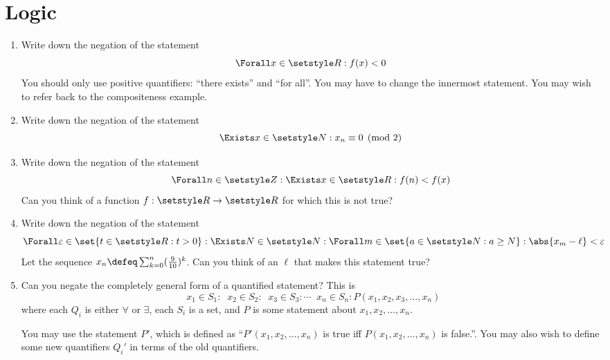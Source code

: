 \section{Logic}

\begin{enumerate}
 \item
  Write down the negation of the statement
  \begin{equation*}
   \Forall x \in \Reals: f(x) < 0
  \end{equation*}
  You should only use positive quantifiers: ``there exists'' and ``for all''.
  You may have to change the innermost statement. You may wish to refer back to
  the compositeness example.
 \item
  Write down the negation of the statement
  \begin{equation*}
   \Exists x \in \Naturals : x_n \equiv 0 \pmod 2
  \end{equation*}
 \item
  Write down the negation of the statement
  \begin{equation*}
   \Forall n \in \Integers :
   \Exists x \in \Reals :
   f(n) < f(x)
  \end{equation*}
  Can you think of a function \(f : \Reals \to \Reals\) for which this is not
  true?
 \item
  Write down the negation of the statement
  \begin{equation*}
   \Forall \epsilon \in \set{t \in \Reals: t > 0} :
   \Exists N \in \Naturals :
   \Forall m \in \set{a \in \Naturals : a \ge N}:
   \abs{x_m - \ell} < \epsilon
  \end{equation*}
  Let the sequence \(x_n \defeq \sum_{k = 0}^n(\frac 9{10})^k\). Can you think
  of an \(\ell\) that makes this statement true?
 \item
  Can you negate the completely general form of a quantified statement? This is
  \begin{equation*}
   \mathop{Q_1} x_1 \in S_1 :
   \mathop{Q_2} x_2 \in S_2 :
   \mathop{Q_3} x_3 \in S_3 :
   \dotsb
   \mathop{Q_n} x_n \in S_n :
   P(x_1, x_2, x_3, \dotsc, x_n)
  \end{equation*}
  where each \(Q_i\) is either \(\forall\) or \(\exists\), each \(S_i\) is a
  set, and \(P\) is some statement about \(x_1, x_2, \dotsc, x_n\).

  You may use the statement \(P'\), which is defined as
  ``\(P'(x_1, x_2, \dotsc, x_n)\) is true iff \(P(x_1, x_2, \dotsc, x_n)\) is
  false.''. You may also wish to define some new quantifiers \(Q_i'\) in terms
  of the old quantifiers.
\end{enumerate}
